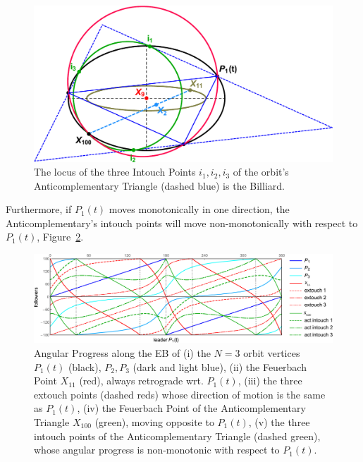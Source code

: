 \begin{figure}[H]
    \centering
    \includegraphics[width=\textwidth]{pics/0048_act_intouch.pdf}
    \caption{The locus of the three Intouch Points $i_1,i_2,i_3$ of the orbit's Anticomplementary Triangle (dashed blue) is the Billiard.}
    \label{fig:act_intouch}
\end{figure}

Furthermore, if $P_1(t)$ moves monotonically in one direction, the Anticomplementary's intouch points will move non-monotonically with respect to $P_1(t)$, Figure~\ref{fig:act-progress}. 

\begin{figure}[H]
    \centering
    \includegraphics[width=\textwidth]{pics/0049_act_progress.pdf}
    \caption{Angular Progress along the EB of (i) the $N=3$ orbit vertices $P_1(t)$ (black), $P_2,P_3$ (dark and light blue), (ii) the Feuerbach Point $X_{11}$ (red), always retrograde wrt. $P_1(t)$, (iii) the three extouch points (dashed reds) whose direction of motion is the same as $P_1(t)$, (iv) the Feuerbach Point of the Anticomplementary Triangle $X_{100}$ (green), moving opposite to $P_1(t)$, (v) the three intouch points of the Anticomplementary Triangle (dashed green), whose angular progress is non-monotonic with respect to $P_1(t)$.}
    \label{fig:act-progress}
\end{figure}
